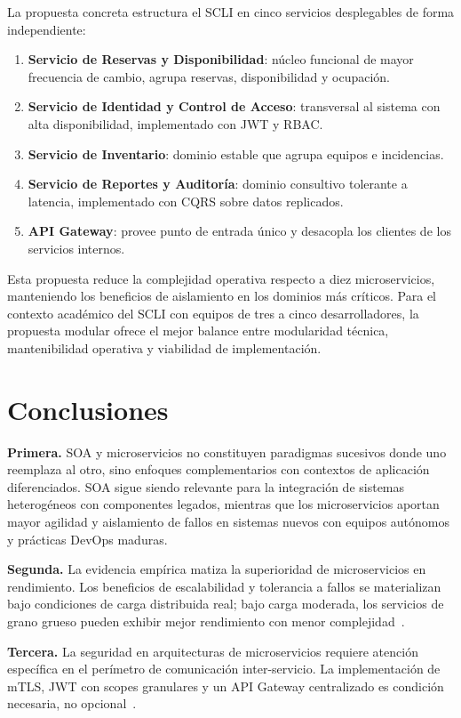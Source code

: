 \documentclass[10pt,twocolumn,letterpaper]{article}
\begin{document}
La propuesta concreta estructura el SCLI en cinco servicios desplegables de forma independiente:

\begin{enumerate}\itemsep1pt
\item \textbf{Servicio de Reservas y Disponibilidad}: núcleo funcional de mayor frecuencia de cambio, agrupa reservas, disponibilidad y ocupación.
\item \textbf{Servicio de Identidad y Control de Acceso}: transversal al sistema con alta disponibilidad, implementado con JWT y RBAC.
\item \textbf{Servicio de Inventario}: dominio estable que agrupa equipos e incidencias.
\item \textbf{Servicio de Reportes y Auditoría}: dominio consultivo tolerante a latencia, implementado con CQRS sobre datos replicados.
\item \textbf{API Gateway}: provee punto de entrada único y desacopla los clientes de los servicios internos.
\end{enumerate}

Esta propuesta reduce la complejidad operativa respecto a diez microservicios, manteniendo los beneficios de aislamiento en los dominios más críticos. Para el contexto académico del SCLI con equipos de tres a cinco desarrolladores, la propuesta modular ofrece el mejor balance entre modularidad técnica, mantenibilidad operativa y viabilidad de implementación.

\section{Conclusiones}

\textbf{Primera.} SOA y microservicios no constituyen paradigmas sucesivos donde uno reemplaza al otro, sino enfoques complementarios con contextos de aplicación diferenciados. SOA sigue siendo relevante para la integración de sistemas heterogéneos con componentes legados, mientras que los microservicios aportan mayor agilidad y aislamiento de fallos en sistemas nuevos con equipos autónomos y prácticas DevOps maduras.

\textbf{Segunda.} La evidencia empírica matiza la superioridad de microservicios en rendimiento. Los beneficios de escalabilidad y tolerancia a fallos se materializan bajo condiciones de carga distribuida real; bajo carga moderada, los servicios de grano grueso pueden exhibir mejor rendimiento con menor complejidad~\cite{b1}.

\textbf{Tercera.} La seguridad en arquitecturas de microservicios requiere atención específica en el perímetro de comunicación inter-servicio. La implementación de mTLS, JWT con scopes granulares y un API Gateway centralizado es condición necesaria, no opcional~\cite{b4,b5}.
\end{document}
